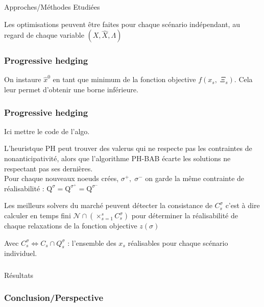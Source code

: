 \documentclass[10pt]{beamer}
\begin{document}
\begin{section}{Approches/Méthodes Etudiées}
    \begin{frame}
        Les optimisations peuvent être faites pour chaque scénario indépendant, au regard de chaque variable $(X, \hat{X}, \Lambda)$
    \end{frame}
    
    
    
    \begin{frame}
        \frametitle{Progressive hedging}
        On instaure $\hat{x}^0$ en tant que minimum de la fonction objective $f(x_s, \; \Xi_s)$. Cela leur permet d'obtenir une borne inférieure.
        
    \end{frame}
    
    \begin{frame}
        \frametitle{Progressive hedging}
         Ici mettre le code de l'algo.
        
        
    \end{frame}
    
    \begin{frame}
       L'heuristque PH peut trouver des valerus qui ne respecte pas les contraintes de nonanticipativité, alors que l'algorithme PH-BAB écarte les solutions ne respectant pas ses dernières.\\
       Pour chaque nouveaux noeuds crées, $\sigma^+,\;\sigma^-$ on garde la même contrainte de réalisabilité : $\mathrm{Q}^\sigma = \mathrm{Q}^{\sigma^+} = \mathrm{Q}^{\sigma^-}$
    \end{frame}
    
    \begin{frame}
      Les meilleurs solvers du marché peuvent détecter la consistance de $C_s^\sigma$ c'est à dire calculer en temps fini 
      $\mathcal{N}\cap(\times_{s = 1}^s C_s^\sigma)$ pour déterminer la réalisabilité de chaque relaxations de la fonction objective $z(\sigma)$
      
      Avec $C_s^\sigma \Leftrightarrow C_s \cap Q_s^\sigma$ : l'ensemble des $x_s$ réalisables pour chaque scénario individuel.
    \end{frame}
    \end{section}
    
    
    \begin{frame}
        \frametitle{}            
    \end{frame}
        
    \begin{section}{Résultats}
    \begin{frame}
    
    \end{frame}
    \end{section}
    
    
    \begin{frame}
        \frametitle{Conclusion/Perspective}
    \end{frame}
    
    \iffalse
    \fi
\end{document}
